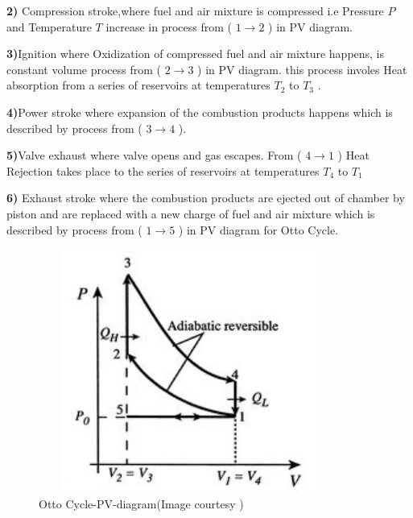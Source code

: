 \documentclass[11pt]{article}
\begin{document}
\textbf{2)} Compression stroke,where fuel and air mixture is compressed i.e Pressure $ P$ and Temperature $ T$ increase in process from ( $ 1\rightarrow2$ ) in PV diagram.

\textbf{3)}Ignition  where Oxidization of compressed fuel and air mixture happens, is constant volume process from ( $ 2\rightarrow3$ ) in PV diagram. this process involes Heat absorption from a series of reservoirs at temperatures $ T_2$ to $ T_3$ .

\textbf{4)}Power stroke where expansion of the combustion products happens which is described by process from ( $ 3\rightarrow4$ ).

\textbf{5)}Valve exhaust where valve opens and gas escapes. From ( $ 4\rightarrow1$ ) Heat Rejection takes place to the series of reservoirs at temperatures $ T_4$ to $ T_1$ 

\textbf{6)} Exhaust stroke where the combustion products are ejected out of chamber by piston and are replaced with a new charge of fuel and air mixture which is described by process from ( $ 1\rightarrow5$ ) in PV diagram for Otto Cycle.

\begin{center}
\begin{figure}[h]
    \centering
  \includegraphics[height=80mm,width=100mm]{OttoIdeal.jpg}
  \caption{Otto Cycle-PV-diagram(Image courtesy \cite{ref14})}
  \label{fig:PV Diagram for Otto Cycle}
\end{figure}
\end{center}
\end{document}
